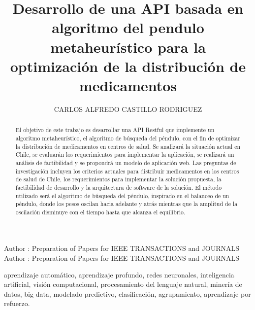 \documentclass{ieeeaccess}
\begin{document}

\title{Desarrollo de una API basada en algoritmo del pendulo metaheurístico para la optimización de la distribución de medicamentos}
\author{\uppercase{Carlos Alfredo Castillo Rodriguez}}
\address[1]{Universidad Bernardo Ohiggins, Santiago de Chile, Chile, (e-mail: cacr1990@gmail.com)}
\tfootnote{}

\markboth
{Author \headeretal: Preparation of Papers for IEEE TRANSACTIONS and JOURNALS}
{Author \headeretal: Preparation of Papers for IEEE TRANSACTIONS and JOURNALS}


\begin{abstract}
El objetivo de este trabajo es desarrollar una API Restful que implemente un algoritmo metaheurístico, el algoritmo de búsqueda del péndulo, con el fin de optimizar la distribución de medicamentos en centros de salud. Se analizará la situación actual en Chile, se evaluarán los requerimientos para implementar la aplicación, se realizará un análisis de factibilidad y se propondrá un modelo de aplicación web. Las preguntas de investigación incluyen los criterios actuales para distribuir medicamentos en los centros de salud de Chile, los requerimientos para implementar la solución propuesta, la factibilidad de desarrollo y la arquitectura de software de la solución. El método utilizado será el algoritmo de búsqueda del péndulo, inspirado en el balanceo de un péndulo, donde los pesos oscilan hacia adelante y atrás mientras que la amplitud de la oscilación disminuye con el tiempo hasta que alcanza el equilibrio.
\end{abstract}

\begin{keywords}
aprendizaje automático, aprendizaje profundo, redes neuronales, inteligencia artificial, visión computacional, procesamiento del lenguaje natural, minería de datos, big data, modelado predictivo, clasificación, agrupamiento, aprendizaje por refuerzo.
\end{keywords}

\titlepgskip=-15pt

\maketitle

\EOD
\end{document}
